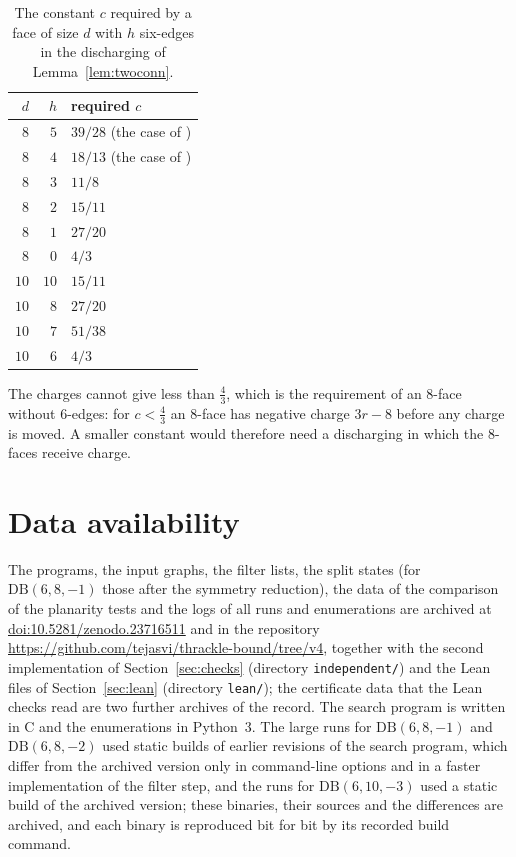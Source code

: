 \documentclass[11pt]{amsart}
\theoremstyle{definition}
\theoremstyle{remark}
\numberwithin{equation}{section}
\newcommand{\DB}{\mathrm{DB}}
\newcommand{\file}[1]{\texttt{#1}}
\newcommand{\SUPPDOI}{10.5281/zenodo.23716511}
\newcommand{\REPOURL}{https://github.com/tejasvi/thrackle-bound/tree/v4}
\begin{document}
\begin{table}[ht]
\centering
\begin{tabular}{rrl}
\toprule
$d$ & $h$ & required $c$\\
\midrule
$8$ & $5$ & $39/28$ (the case of \cite{Xu21})\\
$8$ & $4$ & $18/13$ (the case of \cite{Sco26})\\
$8$ & $3$ & $11/8$\\
$8$ & $2$ & $15/11$\\
$8$ & $1$ & $27/20$\\
$8$ & $0$ & $4/3$\\
$10$ & $10$ & $15/11$\\
$10$ & $8$ & $27/20$\\
$10$ & $7$ & $51/38$\\
$10$ & $6$ & $4/3$\\
\bottomrule
\end{tabular}
\caption{The constant $c$ required by a face of size $d$ with $h$ six-edges in the discharging of Lemma~\ref{lem:twoconn}.}\label{tab:charges}
\end{table}

The charges cannot give less than $\frac43$, which is the requirement of an $8$-face without $6$-edges: for $c<\frac43$ an $8$-face has negative charge $3r-8$ before any charge is moved. A smaller constant would therefore need a discharging in which the $8$-faces receive charge.

\section*{Data availability}
The programs, the input graphs, the filter lists, the split states (for $\DB(6,8,-1)$ those after the symmetry reduction), the data of the comparison of the planarity tests and the logs of all runs and enumerations are archived at \href{https://doi.org/\SUPPDOI}{doi:\SUPPDOI} and in the repository \url{\REPOURL}, together with the second implementation of Section~\ref{sec:checks} (directory \file{independent/}) and the Lean files of Section~\ref{sec:lean} (directory \file{lean/}); the certificate data that the Lean checks read are two further archives of the record. The search program is written in C and the enumerations in Python~3. The large runs for $\DB(6,8,-1)$ and $\DB(6,8,-2)$ used static builds of earlier revisions of the search program, which differ from the archived version only in command-line options and in a faster implementation of the filter step, and the runs for $\DB(6,10,-3)$ used a static build of the archived version; these binaries, their sources and the differences are archived, and each binary is reproduced bit for bit by its recorded build command.
\end{document}
